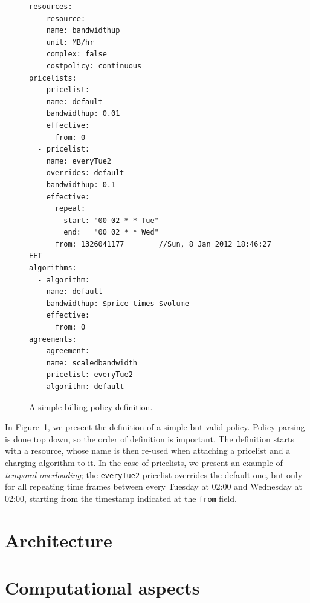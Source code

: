 \documentclass[letterpaper,twocolumn,10pt]{article}
\begin{document}
\begin{figure}
\lstset{language=c, basicstyle=\footnotesize,
stringstyle=\ttfamily, 
flexiblecolumns=true, aboveskip=-0.9em, belowskip=0em, lineskip=0em}

\begin{lstlisting}
resources:
  - resource:
    name: bandwidthup
    unit: MB/hr
    complex: false
    costpolicy: continuous
pricelists:
  - pricelist: 
    name: default
    bandwidthup: 0.01
    effective:
      from: 0
  - pricelist: 
    name: everyTue2
    overrides: default
    bandwidthup: 0.1
    effective:
      repeat:
      - start: "00 02 * * Tue"
        end:   "00 02 * * Wed"
      from: 1326041177        //Sun, 8 Jan 2012 18:46:27 EET
algorithms:
  - algorithm:
    name: default
    bandwidthup: $price times $volume
    effective:
      from: 0
agreements:
  - agreement:
    name: scaledbandwidth
    pricelist: everyTue2
    algorithm: default
\end{lstlisting}
\caption{A simple billing policy definition.} 
\label{fig:dsl}
\end{figure}

In Figure~\ref{fig:dsl}, we present the definition of a simple but valid
policy. Policy parsing is done top down, so the order of definition 
is important. The definition starts with a resource, whose name is then
re-used when attaching a pricelist and a charging algorithm to it.
In the case of pricelists, we present an example of \emph{temporal overloading};
the \texttt{everyTue2} pricelist overrides the default one, but only for 
all repeating time frames between every Tuesday at 02:00 and Wednesday at
02:00, starting from the timestamp indicated at the \texttt{from} field.

\section{Architecture}


\section{Computational aspects}
\end{document}
